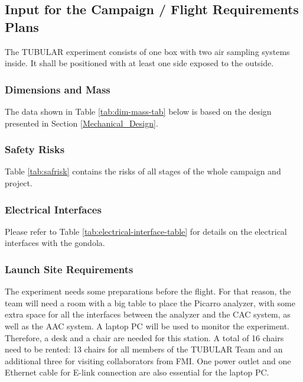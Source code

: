 \subsection{Input for the Campaign / Flight Requirements Plans}

The TUBULAR experiment consists of one box with two air sampling systems inside. It shall be positioned with at least one side exposed to the outside.

\subsubsection{Dimensions and Mass}

The data shown in Table \ref{tab:dim-mass-tab} below is based on the design presented in Section \ref{Mechanical_Design}. %



\subsubsection{Safety Risks}
Table \ref{tab:safrisk} contains the risks of all stages of the whole campaign and project.


\pagebreak
\subsubsection{Electrical Interfaces}

Please refer to Table \ref{tab:electrical-interface-table} for details on the electrical interfaces with the gondola.



\subsubsection{Launch Site Requirements}
The experiment needs some preparations before the flight. For that reason, the team will need a room with a big table to place the Picarro analyzer, with some extra space for all the interfaces between the analyzer and the CAC system, as well as the AAC system.
A laptop PC will be used to monitor the experiment. Therefore, a desk and a chair are needed for this station. A total of 16 chairs need to be rented: 13 chairs for all members of the TUBULAR Team and an additional three for visiting collaborators from FMI. One power outlet and one Ethernet cable for E-link connection are also essential for the laptop PC.

